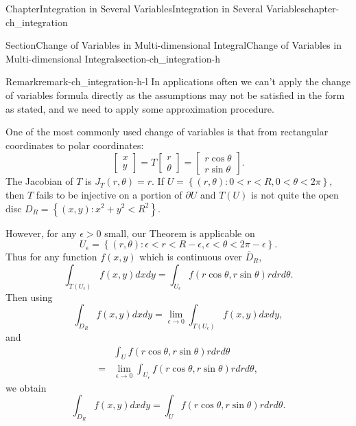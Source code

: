 \documentclass[oneside,10pt,]{book}
\numberwithin{equation}{section}
\newcommand{\amp}{&}
\begin{document}
\begin{chapterptx}{Chapter}{Integration in Several Variables}{}{Integration in Several Variables}{}{}{chapter-ch_integration}
\begin{sectionptx}{Section}{Change of Variables in Multi-dimensional Integral}{}{Change of Variables in Multi-dimensional Integral}{}{}{section-ch_integration-h}
\begin{remark}{Remark}{}{remark-ch_integration-h-l}
In applications often we can't apply the change of variables formula directly as the assumptions may not be satisfied in the form as stated, and we need to apply some approximation procedure.%
\par
One of the most commonly used change of variables is that from rectangular coordinates to polar coordinates:%
\begin{equation*}
\begin{bmatrix} x \\ y \end{bmatrix} = T \begin{bmatrix} r \\ \theta \end{bmatrix} =
\begin{bmatrix} r \cos \theta \\
r\sin \theta \end{bmatrix}.
\end{equation*}
The Jacobian of \(T\) is \(J_T(r,\theta)=r\). If \(U=\left\{(r,\theta): 0 < r <R, 0 < \theta < 2\pi\right\}\), then \(T\) fails to be injective on a portion of \(\partial U\) and \(T(U)\) is not quite the open disc \(D_R=\left\{(x,y):x^2+y^2 < R^2\right\}.\)%
\par
However, for any \(\epsilon >0\) small,  our Theorem  is applicable on%
\begin{equation*}
U_{\epsilon}= \left\{(r,\theta): \epsilon < r< R-\epsilon, \epsilon <  \theta < 2\pi -\epsilon\right\}.
\end{equation*}
Thus for any function \(f(x,y)\) which is continuous over \(\bar D_R\),%
\begin{equation*}
\int_{T(U_{\epsilon})} f(x,y)dxdy = \int_{U_{\epsilon}} f( r \cos \theta,  r\sin \theta) rdrd\theta.
\end{equation*}
Then using%
\begin{equation*}
\int_{D_R}  f(x,y)dxdy = \lim_{\epsilon \to 0} \int_{T(U_{\epsilon})} f(x,y)dxdy,
\end{equation*}
and%
\begin{align*}
\amp \int_{U} f( r \cos \theta,  r\sin \theta) rdrd\theta\\
=\amp \lim_{\epsilon \to 0} \int_{U_{\epsilon}} f( r \cos \theta,  r\sin \theta) rdrd\theta,
\end{align*}
we obtain%
\begin{equation*}
\int_{D_R}  f(x,y)dxdy = \int_{U} f( r \cos \theta,  r\sin \theta) rdrd\theta.
\end{equation*}
%
\par

\end{remark}
\end{sectionptx}
\end{chapterptx}
\end{document}

